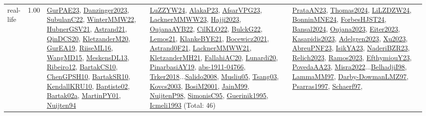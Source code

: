 {\begin{longtable}{p{3cm}r>{\raggedright\arraybackslash}p{6cm}>{\raggedright\arraybackslash}p{6cm}>{\raggedright\arraybackslash}p{8cm}}
\index{real-life}\index{Benchmarks!real-life}real-life &  1.00 & \hyperref[detail:GurPAE23]{GurPAE23}, \hyperref[detail:Danzinger2023]{Danzinger2023}, \hyperref[detail:SubulanC22]{SubulanC22}, \hyperref[detail:WinterMMW22]{WinterMMW22}, \hyperref[detail:HubnerGSV21]{HubnerGSV21}, \hyperref[detail:Astrand21]{Astrand21}, \hyperref[detail:QinDCS20]{QinDCS20}, \hyperref[detail:KletzanderM20]{KletzanderM20}, \hyperref[detail:GurEA19]{GurEA19}, \hyperref[detail:RiiseML16]{RiiseML16}, \hyperref[detail:WangMD15]{WangMD15}, \hyperref[detail:MeskensDL13]{MeskensDL13}, \hyperref[detail:Ribeiro12]{Ribeiro12}, \hyperref[detail:BartakCS10]{BartakCS10}, \hyperref[detail:ChenGPSH10]{ChenGPSH10}, \hyperref[detail:BartakSR10]{BartakSR10}, \hyperref[detail:KendallKRU10]{KendallKRU10}, \hyperref[detail:Baptiste02]{Baptiste02}, \hyperref[detail:Bartak02a]{Bartak02a}, \hyperref[detail:MartinPY01]{MartinPY01}, \hyperref[detail:Nuijten94]{Nuijten94} & \hyperref[detail:LuZZYW24]{LuZZYW24}, \hyperref[detail:AlakaP23]{AlakaP23}, \hyperref[detail:AfsarVPG23]{AfsarVPG23}, \hyperref[detail:LacknerMMWW23]{LacknerMMWW23}, \hyperref[detail:Hajji2023]{Hajji2023}, \hyperref[detail:OujanaAYB22]{OujanaAYB22}, \hyperref[detail:CilKLO22]{CilKLO22}, \hyperref[detail:BulckG22]{BulckG22}, \hyperref[detail:Lemos21]{Lemos21}, \hyperref[detail:KlankeBYE21]{KlankeBYE21}, \hyperref[detail:Bocewicz2021]{Bocewicz2021}, \hyperref[detail:Astrand0F21]{Astrand0F21}, \hyperref[detail:LacknerMMWW21]{LacknerMMWW21}, \hyperref[detail:KletzanderMH21]{KletzanderMH21}, \hyperref[detail:FallahiAC20]{FallahiAC20}, \hyperref[detail:Lunardi20]{Lunardi20}, \hyperref[detail:PinarbasiAY19]{PinarbasiAY19}, \hyperref[detail:abs-1911-04766]{abs-1911-04766}, \hyperref[detail:Trker2018]{Trker2018}...\hyperref[detail:Salido2008]{Salido2008}, \hyperref[detail:Musliu05]{Musliu05}, \hyperref[detail:Tsang03]{Tsang03}, \hyperref[detail:Kovcs2003]{Kovcs2003}, \hyperref[detail:BosiM2001]{BosiM2001}, \hyperref[detail:JainM99]{JainM99}, \hyperref[detail:NuijtenP98]{NuijtenP98}, \hyperref[detail:SimonisC95]{SimonisC95}, \hyperref[detail:Guerinik1995]{Guerinik1995}, \hyperref[detail:Icmeli1993]{Icmeli1993} (Total: 46) & \hyperref[detail:PrataAN23]{PrataAN23}, \hyperref[detail:Thomas2024]{Thomas2024}, \hyperref[detail:LiLZDZW24]{LiLZDZW24}, \hyperref[detail:BonninMNE24]{BonninMNE24}, \hyperref[detail:ForbesHJST24]{ForbesHJST24}, \hyperref[detail:Bansal2024]{Bansal2024}, \hyperref[detail:Oujana2023]{Oujana2023}, \hyperref[detail:Eiter2023]{Eiter2023}, \hyperref[detail:Kasapidis2023]{Kasapidis2023}, \hyperref[detail:Adelgren2023]{Adelgren2023}, \hyperref[detail:Xu2023]{Xu2023}, \hyperref[detail:AbreuPNF23]{AbreuPNF23}, \hyperref[detail:IsikYA23]{IsikYA23}, \hyperref[detail:NaderiBZR23]{NaderiBZR23}, \hyperref[detail:Relich2023]{Relich2023}, \hyperref[detail:Ramos2023]{Ramos2023}, \hyperref[detail:EfthymiouY23]{EfthymiouY23}, \hyperref[detail:PovedaAA23]{PovedaAA23}, \hyperref[detail:Misra2022]{Misra2022}...\hyperref[detail:BelhadjiI98]{BelhadjiI98}, \hyperref[detail:LammaMM97]{LammaMM97}, \hyperref[detail:Darby-DowmanLMZ97]{Darby-DowmanLMZ97}, \hyperref[detail:Psarras1997]{Psarras1997}, \hyperref[detail:Schaerf97]{Schaerf97}, 
\end{longtable}}

